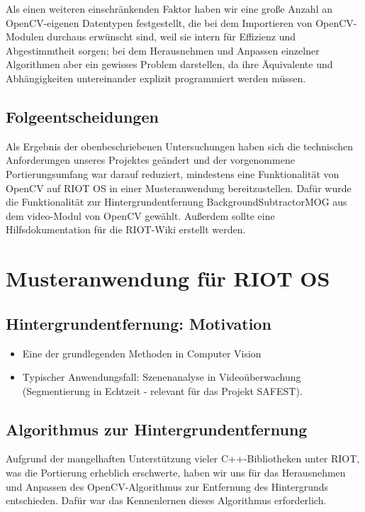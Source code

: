 \documentclass[10pt,a4paper]{article}
\begin{document}
Als einen weiteren einschränkenden Faktor haben wir eine große Anzahl an OpenCV-eigenen Datentypen festgestellt, die bei dem Importieren von OpenCV-Modulen durchaus erwünscht sind, weil sie intern für Effizienz und Abgestimmtheit sorgen; bei dem Herausnehmen und Anpassen einzelner Algorithmen aber ein gewisses Problem darstellen, da ihre Äquivalente und Abhängigkeiten untereinander explizit programmiert werden müssen.

\subsection{Folgeentscheidungen}

Als Ergebnis der obenbeschriebenen Untersuchungen haben sich die technischen Anforderungen unseres Projektes geändert und der vorgenommene Portierungsumfang war darauf reduziert, mindestens eine Funktionalität von OpenCV auf RIOT OS in einer Musteranwendung bereitzustellen. Dafür wurde die Funktionalität zur Hintergrundentfernung BackgroundSubtractorMOG aus dem video-Modul von OpenCV gewählt. Außerdem sollte eine Hilfsdokumentation für die RIOT-Wiki erstellt werden.

\newpage
\section{Musteranwendung für RIOT OS}

\subsection{Hintergrundentfernung: Motivation}

\begin{itemize}
\item Eine der grundlegenden Methoden in Computer Vision
\item Typischer Anwendungsfall: Szenenanalyse in Videoüberwachung (Segmentierung in Echtzeit - relevant für das Projekt SAFEST).
\end{itemize}

\subsection{Algorithmus zur Hintergrundentfernung}

Aufgrund der mangelhaften Unterstützung vieler C++-Bibliotheken unter RIOT, was die Portierung erheblich erschwerte, haben wir uns für das Herausnehmen und Anpassen des OpenCV-Algorithmus zur Entfernung des Hintergrunds entschieden. Dafür war das Kennenlernen dieses Algorithmus erforderlich. \\
\end{document}
